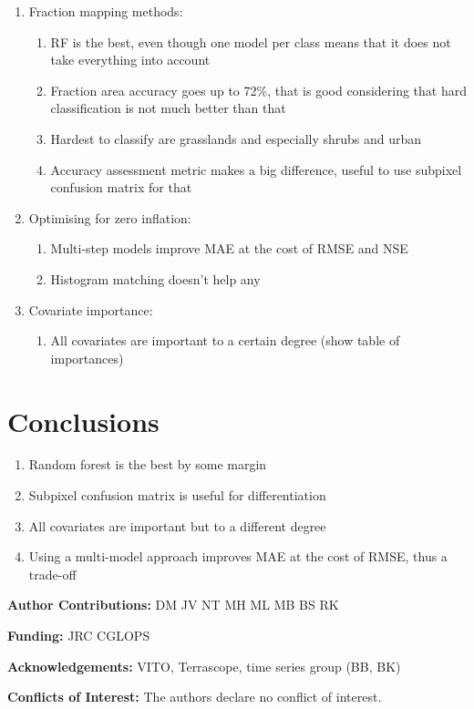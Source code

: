 \documentclass[a4paper,10pt]{article}
\newcommand{\minisection}[1]{\medskip \textbf{#1:}}
\begin{document}
\begin{enumerate}
 \item Fraction mapping methods:
 \begin{enumerate}
    \item RF is the best, even though one model per class means that it does not take everything into account
    \item Fraction area accuracy goes up to 72\%, that is good considering that hard classification is not much better than that
    \item Hardest to classify are grasslands and especially shrubs and urban
    \item Accuracy assessment metric makes a big difference, useful to use subpixel confusion matrix for that
 \end{enumerate}
 \item Optimising for zero inflation:
 \begin{enumerate}
    \item Multi-step models improve MAE at the cost of RMSE and NSE
    \item Histogram matching doesn't help any
 \end{enumerate}
 \item Covariate importance:
 \begin{enumerate}
    \item All covariates are important to a certain degree (show table of importances)
 \end{enumerate}
\end{enumerate}

\section{Conclusions}

\begin{enumerate}
 \item Random forest is the best by some margin
 \item Subpixel confusion matrix is useful for differentiation
 \item All covariates are important but to a different degree
 \item Using a multi-model approach improves MAE at the cost of RMSE, thus a trade-off
\end{enumerate}

\minisection{Author Contributions} DM JV NT MH ML MB BS RK

\minisection{Funding} JRC CGLOPS

\minisection{Acknowledgements} VITO, Terrascope, time series group (BB, BK)

\minisection{Conflicts of Interest} The authors declare no conflict of interest.


\printnoidxglossary[type=acronym]


\end{document}
